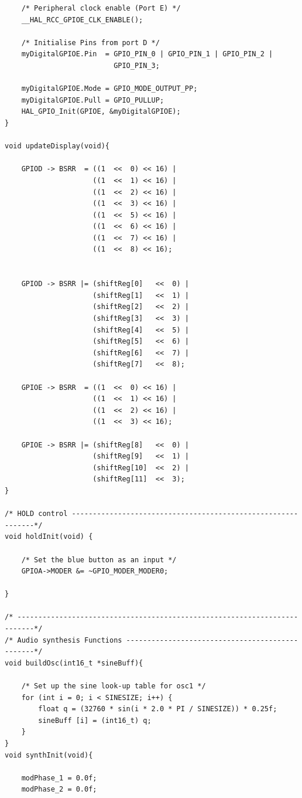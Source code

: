 \documentclass[12pt]{article}
\begin{document}
\begin{verbatim}
    /* Peripheral clock enable (Port E) */
    __HAL_RCC_GPIOE_CLK_ENABLE();
	
    /* Initialise Pins from port D */
    myDigitalGPIOE.Pin  = GPIO_PIN_0 | GPIO_PIN_1 | GPIO_PIN_2 |
                          GPIO_PIN_3;
											 
    myDigitalGPIOE.Mode = GPIO_MODE_OUTPUT_PP;
    myDigitalGPIOE.Pull = GPIO_PULLUP;
    HAL_GPIO_Init(GPIOE, &myDigitalGPIOE);
}

void updateDisplay(void){
	
    GPIOD -> BSRR  = ((1  <<  0) << 16) |
                     ((1  <<  1) << 16) |
                     ((1  <<  2) << 16) |
                     ((1  <<  3) << 16) |
                     ((1  <<  5) << 16) |
                     ((1  <<  6) << 16) |
                     ((1  <<  7) << 16) |
                     ((1  <<  8) << 16);

 
    GPIOD -> BSRR |= (shiftReg[0]   <<  0) |
                     (shiftReg[1]   <<  1) |
                     (shiftReg[2]   <<  2) |
                     (shiftReg[3]   <<  3) |
                     (shiftReg[4]   <<  5) |
                     (shiftReg[5]   <<  6) |
                     (shiftReg[6]   <<  7) |
                     (shiftReg[7]   <<  8);
 	
    GPIOE -> BSRR  = ((1  <<  0) << 16) |
                     ((1  <<  1) << 16) |
                     ((1  <<  2) << 16) |
                     ((1  <<  3) << 16);
				 
    GPIOE -> BSRR |= (shiftReg[8]   <<  0) |
                     (shiftReg[9]   <<  1) |
                     (shiftReg[10]  <<  2) |
                     (shiftReg[11]  <<  3);			 
}
	
/* HOLD control -------------------------------------------------------------*/
void holdInit(void) {
	
    /* Set the blue button as an input */
    GPIOA->MODER &= ~GPIO_MODER_MODER0;
	
}

/* --------------------------------------------------------------------------*/
/* Audio synthesis Functions ------------------------------------------------*/
void buildOsc(int16_t *sineBuff){
	
    /* Set up the sine look-up table for osc1 */ 
    for (int i = 0; i < SINESIZE; i++) {
        float q = (32760 * sin(i * 2.0 * PI / SINESIZE)) * 0.25f;    
        sineBuff [i] = (int16_t) q; 
    }
}
void synthInit(void){
	
    modPhase_1 = 0.0f;
    modPhase_2 = 0.0f;


\end{verbatim}
\end{document}
